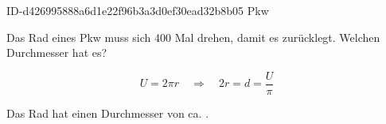 \begin{exercise}
      {ID-d426995888a6d1e22f96b3a3d0ef30ead32b8b05}
      {Pkw}
  \ifproblem\problem\par
    Das Rad eines Pkw muss sich \num{400} Mal drehen, damit es 
    zurücklegt. Welchen Durchmesser hat es?
  \fi
  \ifoutline\outline\par
    \begin{equation*}
      U=2\pi r
      \quad\Rightarrow\quad
      2r=d=\frac{U}{\pi}
    \end{equation*}
  \fi
  \ifoutcome\outcome\par
    Das Rad hat einen Durchmesser von ca. .
  \fi
\end{exercise}
